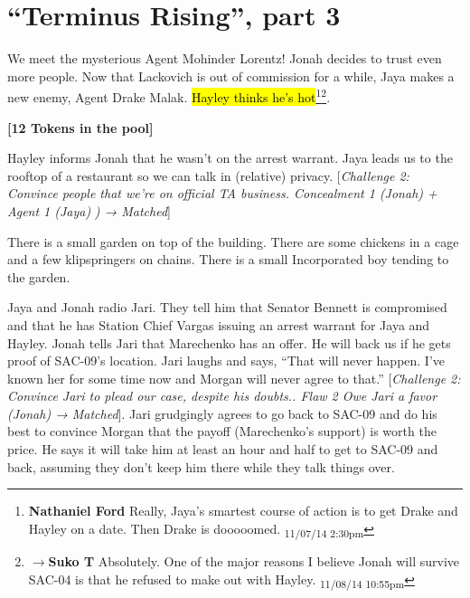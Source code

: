\setcounter{chapter}{ 28 }
\chapter{\textbf{``Terminus Rising'', part 3} }









We meet the mysterious Agent Mohinder Lorentz!  Jonah decides to trust even more people.  Now that Lackovich is out of commission for a while, Jaya makes a new enemy, Agent Drake Malak. \hl{Hayley thinks he's hot}\footnote{\textbf{Nathaniel Ford }Really, Jaya's smartest course of action is to get Drake and Hayley on a date. Then Drake is dooooomed. \textsubscript{11/07/14 2:30pm}}\footnote{$\rightarrow$\textbf{Suko T }Absolutely.  One of the major reasons I believe Jonah will survive SAC-04 is that he refused to make out with Hayley. \textsubscript{11/08/14 10:55pm}}.



\noindent\hrulefill





\textbf{{[}12 Tokens in the pool{]}}



Hayley informs Jonah that he wasn't on the arrest warrant.  Jaya leads us to the rooftop of a restaurant so we can talk in (relative) privacy.  {[}\textit{Challenge 2: Convince people that we're on official TA business.  Concealment 1 (Jonah) + Agent 1 (Jaya) }\textit{) → Matched}{]}



There is a small garden on top of the building.  There are some chickens in a cage and a few klipspringers on chains.  There is a small Incorporated boy tending to the garden.



Jaya and Jonah radio Jari.  They tell him that Senator Bennett is compromised and that he has Station Chief Vargas issuing an arrest warrant for Jaya and Hayley.  Jonah tells Jari that Marechenko has an offer.  He will back us if he gets proof of SAC-09's location.  Jari laughs and says, ``That will never happen.  I've known her for some time now and Morgan will never agree to that.''   {[}\textit{Challenge 2: Convince Jari to plead our case, despite his doubts..  Flaw 2 Owe Jari a favor (Jonah) → Matched}{]}.  Jari grudgingly agrees to go back to SAC-09 and do his best to convince Morgan that the payoff (Marechenko's support) is worth the price.  He says it will take him at least an hour and half to get to SAC-09 and back, assuming they don't keep him there while they talk things over.



